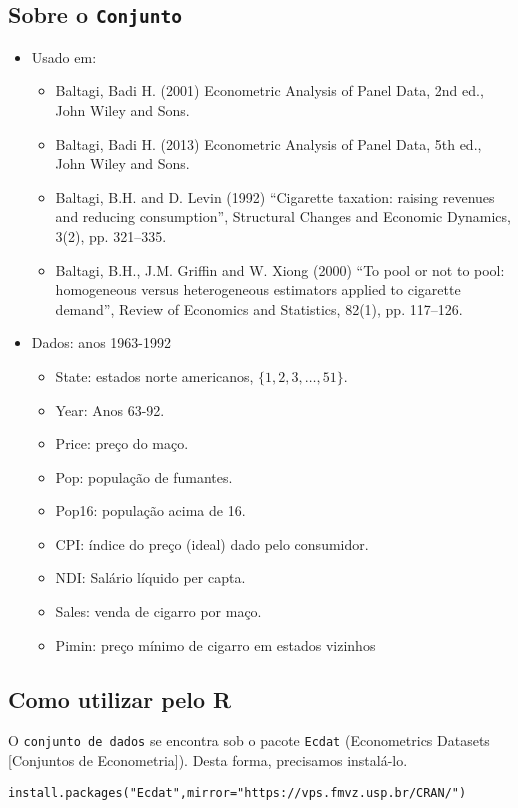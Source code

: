 \documentclass[12pt]{abntex2}
\begin{document}
\subsection{Sobre o \texttt{Conjunto}}
\label{sec:orgc64d986}
\begin{itemize}
\item Usado em:
\begin{itemize}
\item Baltagi, Badi H. (2001) Econometric Analysis of Panel Data, 2nd ed., John Wiley and Sons.
\item Baltagi, Badi H. (2013) Econometric Analysis of Panel Data, 5th ed., John Wiley and Sons.
\item Baltagi, B.H. and D. Levin (1992) “Cigarette taxation: raising revenues and reducing consumption”, Structural Changes and Economic Dynamics, 3(2), pp. 321–335.
\item Baltagi, B.H., J.M. Griffin and W. Xiong (2000) “To pool or not to pool: homogeneous versus heterogeneous estimators applied to cigarette demand”, Review of Economics and Statistics, 82(1), pp. 117–126.
\end{itemize}
\item Dados: anos 1963-1992
\begin{itemize}
\item State: estados norte americanos, \(\{1,2,3, \ldots, 51\}\).
\item Year: Anos 63-92.
\item Price: preço do maço.
\item Pop: população de fumantes.
\item Pop16: população acima de 16.
\item CPI: índice do preço (ideal) dado pelo consumidor.
\item NDI: Salário líquido per capta.
\item Sales: venda de cigarro por maço.
\item Pimin: preço mínimo de cigarro em estados vizinhos
\end{itemize}
\end{itemize}
\subsection{Como utilizar pelo R}
\label{sec:org6e2eb10}

O \texttt{conjunto de dados} se encontra sob o pacote \texttt{Ecdat} (Econometrics
Datasets [Conjuntos de Econometria]). Desta forma, precisamos
instalá-lo.

\begin{verbatim}
install.packages("Ecdat",mirror="https://vps.fmvz.usp.br/CRAN/")
\end{verbatim}
\end{document}
